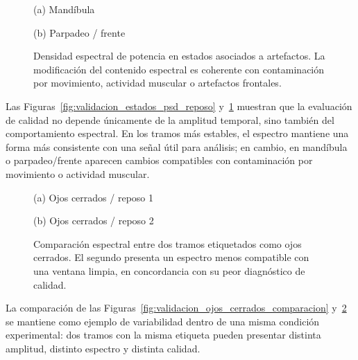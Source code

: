 \documentclass[../main.tex]{subfiles}
\begin{document}
\begin{figure}[htbp]
    \centering
    \begin{minipage}{0.49\textwidth}
        \centering
        \small (a) Mandíbula
    \end{minipage}
    \hfill
    \begin{minipage}{0.49\textwidth}
        \centering
        \small (b) Parpadeo / frente
    \end{minipage}
    \caption{Densidad espectral de potencia en estados asociados a artefactos. La modificación del contenido espectral es coherente con contaminación por movimiento, actividad muscular o artefactos frontales.}
    \label{fig:validacion_estados_psd_artefactos}
\end{figure}

Las Figuras~\ref{fig:validacion_estados_psd_reposo} y~\ref{fig:validacion_estados_psd_artefactos} muestran que la evaluación de calidad no depende únicamente de la amplitud temporal, sino también del comportamiento espectral. En los tramos más estables, el espectro mantiene una forma más consistente con una señal útil para análisis; en cambio, en mandíbula o parpadeo/frente aparecen cambios compatibles con contaminación por movimiento o actividad muscular.

\begin{figure}[htbp]
    \centering
    \begin{minipage}{0.49\textwidth}
        \centering
        \small (a) Ojos cerrados / reposo 1
    \end{minipage}
    \hfill
    \begin{minipage}{0.49\textwidth}
        \centering
        \small (b) Ojos cerrados / reposo 2
    \end{minipage}
    \caption{Comparación espectral entre dos tramos etiquetados como ojos cerrados. El segundo presenta un espectro menos compatible con una ventana limpia, en concordancia con su peor diagnóstico de calidad.}
    \label{fig:validacion_ojos_cerrados_psd}
\end{figure}

La comparación de las Figuras~\ref{fig:validacion_ojos_cerrados_comparacion} y~\ref{fig:validacion_ojos_cerrados_psd} se mantiene como ejemplo de variabilidad dentro de una misma condición experimental: dos tramos con la misma etiqueta pueden presentar distinta amplitud, distinto espectro y distinta calidad.
\end{document}
